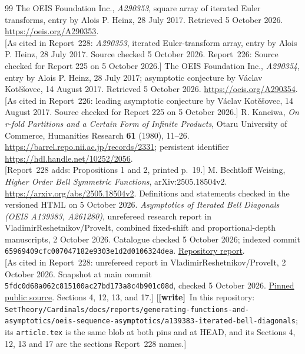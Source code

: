 \documentclass[11pt,letterpaper]{article}
\theoremstyle{remark}\newtheorem{remark}[theorem]{Remark}
\newcommand{\file}[1]{\nolinkurl{#1}}
\newcommand{\wtag}{\textup{\textbf{[write]}}}
\begin{document}
\begin{thebibliography}{99}
 The OEIS Foundation Inc., \emph{A290353}, square array of iterated Euler transforms, entry by Alois P. Heinz, 28 July 2017. Retrieved 5 October 2026. \url{https://oeis.org/A290353}.\small
\\{}[As cited in Report~228: \emph{A290353}, iterated Euler-transform array, entry by Alois P. Heinz, 28 July 2017. Source checked 5 October 2026. Report~226: Source checked for Report 225 on 5 October 2026.]
 The OEIS Foundation Inc., \emph{A290354}, entry by Alois P. Heinz, 28 July 2017; asymptotic conjecture by V\'aclav Kot\v{e}\v{s}ovec, 14 August 2017. Retrieved 5 October 2026. \url{https://oeis.org/A290354}.
\\{}[As cited in Report~226: leading asymptotic conjecture by V\'aclav Kot\v{e}\v{s}ovec, 14 August 2017. Source checked for Report 225 on 5 October 2026.]
 R. Kaneiwa, \emph{On r-fold Partitions and a Certain Form of Infinite Products}, Otaru University of Commerce, Humanities Research \textbf{61} (1980), 11--26. \url{https://barrel.repo.nii.ac.jp/records/2331}; persistent identifier \url{https://hdl.handle.net/10252/2056}.
\\{}[Report~228 adds: Propositions 1 and 2, printed p.~19.]
 M. Bechtloff Weising, \emph{Higher Order Bell Symmetric Functions}, arXiv:2505.18504v2. \url{https://arxiv.org/abs/2505.18504v2}. Definitions and statements checked in the versioned HTML on 5 October 2026.
 \emph{Asymptotics of Iterated Bell Diagonals (OEIS A139383, A261280)}, unrefereed research report in VladimirReshetnikov/ProveIt, combined fixed-shift and proportional-depth manuscripts, 2 October 2026. Catalogue checked 5 October 2026; indexed commit \texttt{65969409cfc007047182e9303e1d2d0106324dea}. \href{https://github.com/VladimirReshetnikov/ProveIt/tree/main/SetTheory/Cardinals/docs/reports/generating-functions-and-asymptotics/oeis-sequence-asymptotics/a139383-iterated-bell-diagonals}{Repository report}.
\\{}[As cited in Report~228: unrefereed report in VladimirReshetnikov/ProveIt, 2 October 2026. Snapshot at main commit \texttt{5fdc0d68a062c815100ac27bd173a8c4b901c08d}, checked 5 October 2026. \href{https://github.com/VladimirReshetnikov/ProveIt/blob/5fdc0d68a062c815100ac27bd173a8c4b901c08d/SetTheory/Cardinals/docs/reports/generating-functions-and-asymptotics/oeis-sequence-asymptotics/a139383-iterated-bell-diagonals/article.tex}{Pinned public source}. Sections 4, 12, 13, and 17.] [\wtag\ In this repository: \file{SetTheory/Cardinals/docs/reports/generating-functions-and-asymptotics/oeis-sequence-asymptotics/a139383-iterated-bell-diagonals}; its \file{article.tex} is the same blob at both pins and at HEAD, and its Sections 4, 12, 13 and 17 are the sections Report~228 names.]

\end{thebibliography}
\end{document}
